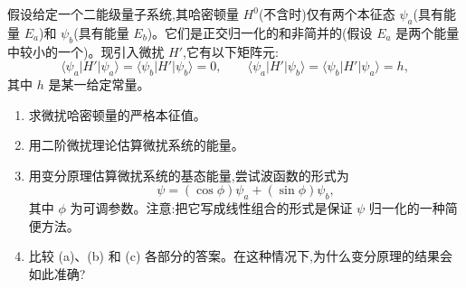 \begin{question}
假设给定一个二能级量子系统,其哈密顿量 $H^0$(不含时)仅有两个本征态 $\psi_a$(具有能量 $E_a$)和 $\psi_b$(具有能量 $E_b$)。它们是正交归一化的和非简并的(假设 $E_a$ 是两个能量中较小的一个)。现引入微扰 $H'$,它有以下矩阵元:
\[
\langle\psi_a|H'|\psi_a\rangle=\langle\psi_b|H'|\psi_b\rangle=0,\qquad
\langle\psi_a|H'|\psi_b\rangle=\langle\psi_b|H'|\psi_a\rangle=h,
\]
其中 $h$ 是某一给定常量。
\begin{enumerate}
\item 求微扰哈密顿量的严格本征值。
\item 用二阶微扰理论估算微扰系统的能量。
\item 用变分原理估算微扰系统的基态能量,尝试波函数的形式为
\[
\psi=(\cos\phi)\psi_a+(\sin\phi)\psi_b,
\]
其中 $\phi$ 为可调参数。注意:把它写成线性组合的形式是保证 $\psi$ 归一化的一种简便方法。
\item 比较 (a)、(b) 和 (c) 各部分的答案。在这种情况下,为什么变分原理的结果会如此准确?
\end{enumerate}
\end{question}
